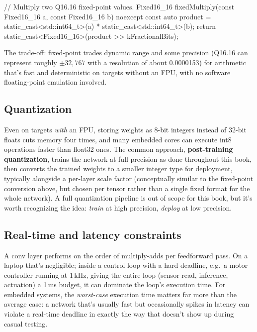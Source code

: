 \begin{cppcode}
// Multiply two Q16.16 fixed-point values.
Fixed16_16 fixedMultiply(const Fixed16_16 a, const Fixed16_16 b) noexcept
{
    const auto product = static_cast<std::int64_t>(a) * static_cast<std::int64_t>(b);
    return static_cast<Fixed16_16>(product >> kFractionalBits);
}
\end{cppcode}

The trade-off: fixed-point trades dynamic range and some precision (Q16.16 can represent roughly
$\pm 32{,}767$ with a resolution of about 0.0000153) for arithmetic that's fast and deterministic on
targets without an FPU, with no software floating-point emulation involved.

\subsection{Quantization}
\label{c10:sec:quantization}
Even on targets \emph{with} an FPU, storing weights as 8-bit integers instead of 32-bit floats cuts
memory four times, and many embedded cores can execute int8 operations faster than float32 ones.
The common approach, \textbf{post-training quantization}, trains the network at full precision as
done throughout this book, then converts the trained weights to a smaller integer type for
deployment, typically alongside a per-layer scale factor (conceptually similar to the fixed-point
conversion above, but chosen per tensor rather than a single fixed format for the whole network). A
full quantization pipeline is out of scope for this book, but it's worth recognizing the idea:
\emph{train} at high precision, \emph{deploy} at low precision.

\subsection{Real-time and latency constraints}
\label{c10:sec:realtime}
A conv layer performs on the order of  multiply-adds per feedforward
pass. On a laptop that's negligible; inside a control loop with a hard deadline, e.g.\ a motor
controller running at 1\,kHz, giving the entire loop (sensor read, inference, actuation) a 1\,ms
budget, it can dominate the loop's execution time. For embedded systems, the \emph{worst-case}
execution time matters far more than the average case: a network that's usually fast but
occasionally spikes in latency can violate a real-time deadline in exactly the way that doesn't
show up during casual testing.


